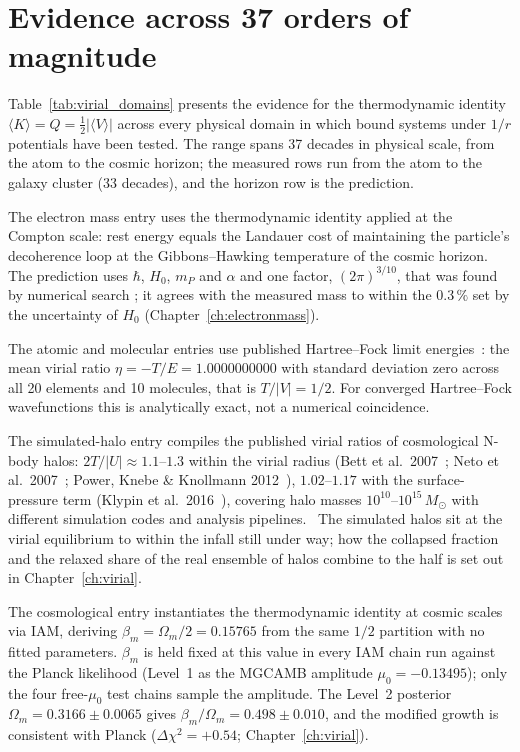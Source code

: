 \section{Evidence across 37 orders of magnitude}\label{sec:vi_evidence}
Table~\ref{tab:virial_domains} presents the evidence for the thermodynamic identity $\langle K\rangle=Q=\tfrac12|\langle V\rangle|$ across every physical
domain in which bound systems under $1/r$ potentials have been tested. The range spans 37 decades in physical scale, from the atom to the cosmic horizon; the measured rows run from the atom to the galaxy cluster (33 decades),
and the horizon row is the prediction. \calc

The electron mass entry uses the thermodynamic identity applied at the Compton scale: rest energy equals the Landauer cost of maintaining the particle's
decoherence loop at the Gibbons--Hawking temperature of the cosmic horizon. The prediction uses $\hbar$, $H_0$, $m_P$ and $\alpha$ and one factor, $(2\pi)^{3/10}$, that was found by numerical search \fitted;
it agrees with the measured mass to within the $0.3\,\%$ set by the uncertainty of $H_0$ (Chapter~\ref{ch:electronmass}). \conjecture

The atomic and molecular entries use published Hartree--Fock limit energies~\cite{ClementiRoetti1974,Bunge1993}: the mean virial ratio $\eta=-T/E=1.0000000000$
with standard deviation zero across all 20 elements and 10 molecules, that is $T/|V|=1/2$. For converged Hartree--Fock wavefunctions this is analytically
exact, not a numerical coincidence. \calc

The simulated-halo entry compiles the published virial ratios of cosmological N-body halos: $2T/|U|\approx1.1$--$1.3$ within the virial radius
(Bett et al.\ 2007~\cite{Bett2007}; Neto et al.\ 2007~\cite{Neto2007}; Power, Knebe \& Knollmann 2012~\cite{Power2012}), $1.02$--$1.17$ with the
surface-pressure term (Klypin et al.\ 2016~\cite{Klypin2016}), covering halo masses $10^{10}$--$10^{15}\,M_\odot$ with different simulation codes and
analysis pipelines. \observed\ The simulated halos sit at the virial equilibrium to within the infall still under way; how the collapsed fraction and the
relaxed share of the real ensemble of halos combine to the half is set out in Chapter~\ref{ch:virial}.

The cosmological entry instantiates the thermodynamic identity at cosmic scales via IAM, deriving
$\beta_m=\Omega_m/2=0.15765$ from the same $1/2$ partition with no fitted parameters. $\beta_m$ is held fixed at this value in every IAM chain run against
the Planck likelihood (Level~1 as the MGCAMB amplitude $\mu_0=-0.13495$); only the four free-$\mu_0$ test chains sample the amplitude. The Level~2 posterior $\Omega_m=0.3166\pm0.0065$ gives
$\beta_m/\Omega_m=0.498\pm0.010$, and the modified growth is consistent with Planck ($\Delta\chi^2=+0.54$; Chapter~\ref{ch:virial}). \measured

